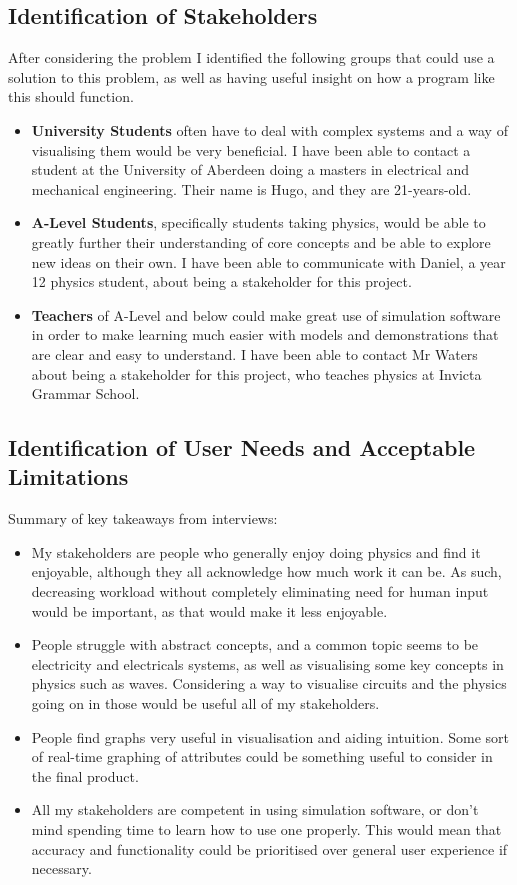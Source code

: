 \documentclass[tikz, 11pt]{article}
\begin{document}
        \subsection{Identification of Stakeholders}
            After considering the problem I identified the following groups that could use a solution to this problem, as well as having useful insight on how a program like this should function.
            \begin{itemize}
                \item \textbf{University Students} often have to deal with complex systems and a way of visualising them would be very beneficial. I have been able to contact a student at the University of Aberdeen doing a masters in electrical and mechanical engineering. Their name is Hugo, and they are 21-years-old.
                \item \textbf{A-Level Students}, specifically students taking physics,  would be able to greatly further their understanding of core concepts and be able to explore new ideas on their own. I have been able to communicate with Daniel, a year 12 physics student, about being a stakeholder for this project.
                \item \textbf{Teachers} of A-Level and below could make great use of simulation software in order to make learning much easier with models and demonstrations that are clear and easy to understand. I have been able to contact Mr Waters about being a stakeholder for this project, who teaches physics at Invicta Grammar School.
            \end{itemize}
            
        \subsection{Identification of User Needs and Acceptable Limitations}
            Summary of key takeaways from interviews:
            \begin{itemize}
                \item My stakeholders are people who generally enjoy doing physics and find it enjoyable, although they all acknowledge how much work it can be. As such, decreasing workload without completely eliminating need for human input would be important, as that would make it less enjoyable.
                \item People struggle with abstract concepts, and a common topic seems to be electricity and electricals systems, as well as visualising some key concepts in physics such as waves. Considering a way to visualise circuits and the physics going on in those would be useful all of my stakeholders.
                \item People find graphs very useful in visualisation and aiding intuition. Some sort of real-time graphing of attributes could be something useful to consider in the final product.
                \item All my stakeholders are competent in using simulation software, or don't mind spending time to learn how to use one properly. This would mean that accuracy and functionality could be prioritised over general user experience if necessary. 
            \end{itemize}
\end{document}
